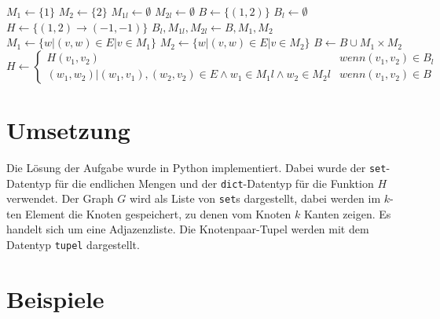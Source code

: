 \documentclass[a4paper,10pt,ngerman]{scrartcl}
\begin{document}
\begin{algorithmic}
  \State$M_1 \gets \{1\}$
  \State$M_2 \gets \{2\}$
  \State$M_{1l} \gets \emptyset$
  \State$M_{2l} \gets \emptyset$
  \State$B \gets \{(1, 2)\}$
  \State$B_l \gets \emptyset$
  \State$H \gets \{(1, 2) \rightarrow (-1, -1)\}$
  \State$B_l, M_{1l}, M_{2l} \gets B, M_1, M_2$
  \State$M_1 \gets \{w | (v, w) \in E | v \in M_1\} $
  \State$M_2 \gets \{w | (v, w) \in E | v \in M_2\} $
  \State$B \gets B \cup M_1 \times M_2$
  \State$H \gets \begin{cases}
      H(v_1, v_2)                                                                 & wenn (v_1,v_2) \in B_l \\
      (w_1, w_2)|(w_1,v_1), (w_2,v_2) \in E \land w_1 \in M_1l \land w_2 \in M_2l & wenn (v_1,v_2) \in B
    \end{cases}$
  \EndWhile
\end{algorithmic}
\section{Umsetzung}
Die Lösung der Aufgabe wurde in Python implementiert. Dabei wurde der
\lstinline|set|-Datentyp für die endlichen Mengen und der
\lstinline|dict|-Datentyp für die Funktion $H$ verwendet. Der Graph $G$ wird
als Liste von \lstinline|set|s dargestellt, dabei werden im $k$-ten Element die
Knoten gespeichert, zu denen vom Knoten $k$ Kanten zeigen. Es handelt sich um
eine Adjazenzliste. Die Knotenpaar-Tupel werden mit dem Datentyp
\lstinline|tupel| dargestellt. \\

\section{Beispiele}
\end{document}
